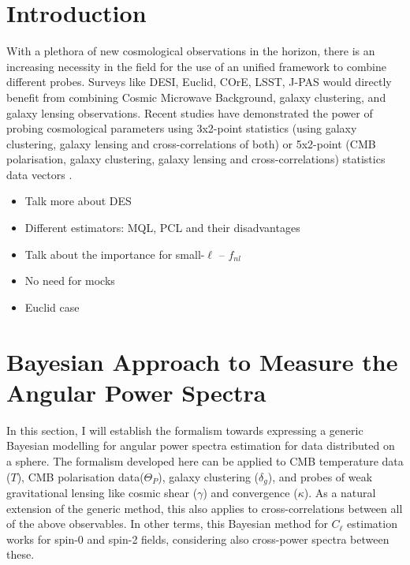 \section{Introduction}
With a plethora of new cosmological observations in the horizon, there is an increasing necessity in the field for the use of an unified framework to combine different probes. Surveys like DESI, Euclid, COrE, LSST, J-PAS  would directly benefit from combining Cosmic Microwave Background, galaxy clustering, and galaxy lensing observations. 
Recent studies have demonstrated the power of probing cosmological parameters using 3x2-point statistics (using galaxy clustering, galaxy lensing and cross-correlations of both) or 5x2-point (CMB polarisation, galaxy clustering, galaxy lensing and cross-correlations) statistics data vectors \cite{DES and Niccola}. 
\begin{itemize}
\item Talk more about DES
\item Different estimators: MQL, PCL and their disadvantages
\item Talk about the importance for small-$\ell$ -- $f_{nl}$
\item No need for mocks
\item Euclid case
\end{itemize}

\section{Bayesian Approach to Measure the Angular Power Spectra}\label{Sec:BPL:Modeling}
In this section, I will establish the formalism towards expressing a generic Bayesian modelling for angular power spectra estimation for data distributed on a sphere. The formalism developed here can be applied to CMB temperature data ($T$), CMB polarisation data($\Theta_P$), galaxy clustering ($\delta_g$), and probes of weak gravitational lensing like cosmic shear ($\gamma$) and convergence ($\kappa$). As a natural extension of the generic method, this also applies to cross-correlations between all of the above observables. In other terms, this Bayesian method for $C_{\ell}$ estimation works for spin-0 and spin-2 fields, considering also cross-power spectra between these.

